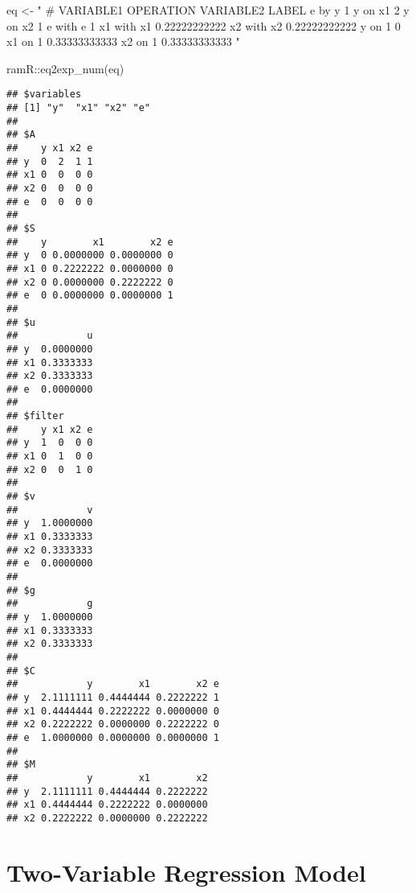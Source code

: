 \documentclass[
]{book}
\newenvironment{Shaded}{\begin{snugshade}}{\end{snugshade}}
\newcommand{\FunctionTok}[1]{\textcolor[rgb]{0.00,0.00,0.00}{#1}}
\newcommand{\NormalTok}[1]{#1}
\newcommand{\OtherTok}[1]{\textcolor[rgb]{0.56,0.35,0.01}{#1}}
\newcommand{\SpecialCharTok}[1]{\textcolor[rgb]{0.00,0.00,0.00}{#1}}
\newcommand{\StringTok}[1]{\textcolor[rgb]{0.31,0.60,0.02}{#1}}
\theoremstyle{definition}
\theoremstyle{definition}
\theoremstyle{definition}
\theoremstyle{remark}
\begin{document}
\begin{Shaded}
\begin{Highlighting}[]
\NormalTok{eq }\OtherTok{\textless{}{-}} \StringTok{"}
\StringTok{  \# VARIABLE1 OPERATION VARIABLE2 LABEL}
\StringTok{  e           by        y         1}
\StringTok{  y           on        x1        2}
\StringTok{  y           on        x2        1}
\StringTok{  e           with      e         1}
\StringTok{  x1          with      x1        0.22222222222}
\StringTok{  x2          with      x2        0.22222222222}
\StringTok{  y           on        1         0}
\StringTok{  x1          on        1         0.33333333333}
\StringTok{  x2          on        1         0.33333333333}
\StringTok{"}
\end{Highlighting}
\end{Shaded}

\begin{Shaded}
\begin{Highlighting}[]
\NormalTok{ramR}\SpecialCharTok{::}\FunctionTok{eq2exp\_num}\NormalTok{(eq)}
\end{Highlighting}
\end{Shaded}

\begin{verbatim}
## $variables
## [1] "y"  "x1" "x2" "e" 
## 
## $A
##    y x1 x2 e
## y  0  2  1 1
## x1 0  0  0 0
## x2 0  0  0 0
## e  0  0  0 0
## 
## $S
##    y        x1        x2 e
## y  0 0.0000000 0.0000000 0
## x1 0 0.2222222 0.0000000 0
## x2 0 0.0000000 0.2222222 0
## e  0 0.0000000 0.0000000 1
## 
## $u
##            u
## y  0.0000000
## x1 0.3333333
## x2 0.3333333
## e  0.0000000
## 
## $filter
##    y x1 x2 e
## y  1  0  0 0
## x1 0  1  0 0
## x2 0  0  1 0
## 
## $v
##            v
## y  1.0000000
## x1 0.3333333
## x2 0.3333333
## e  0.0000000
## 
## $g
##            g
## y  1.0000000
## x1 0.3333333
## x2 0.3333333
## 
## $C
##            y        x1        x2 e
## y  2.1111111 0.4444444 0.2222222 1
## x1 0.4444444 0.2222222 0.0000000 0
## x2 0.2222222 0.0000000 0.2222222 0
## e  1.0000000 0.0000000 0.0000000 1
## 
## $M
##            y        x1        x2
## y  2.1111111 0.4444444 0.2222222
## x1 0.4444444 0.2222222 0.0000000
## x2 0.2222222 0.0000000 0.2222222
\end{verbatim}

\hypertarget{ram-two-reg}{%
\chapter{Two-Variable Regression Model}\label{ram-two-reg}}
\end{document}
